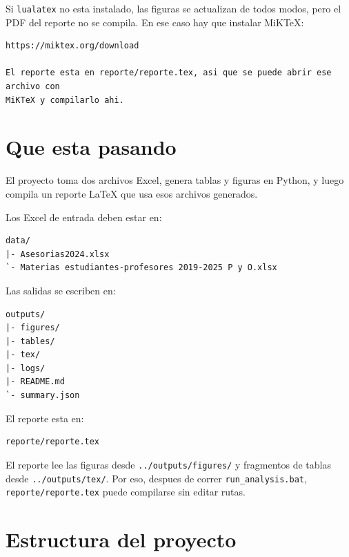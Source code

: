 \documentclass[11pt,letterpaper]{article}
\newcommand{\code}[1]{\texttt{#1}}
\begin{document}
\begin{advertencia}
Si \code{lualatex} no esta instalado, las figuras se actualizan de todos modos,
pero el PDF del reporte no se compila. En ese caso hay que instalar MiKTeX:

\begin{verbatim}
https://miktex.org/download

El reporte esta en reporte/reporte.tex, asi que se puede abrir ese archivo con
MiKTeX y compilarlo ahi.
\end{verbatim}
\end{advertencia}



\section{Que esta pasando}

El proyecto toma dos archivos Excel, genera tablas y figuras en Python, y luego
compila un reporte LaTeX que usa esos archivos generados.

\begin{summary}
Los Excel de entrada deben estar en:

\begin{verbatim}
data/
|- Asesorias2024.xlsx
`- Materias estudiantes-profesores 2019-2025 P y O.xlsx
\end{verbatim}
\end{summary}

Las salidas se escriben en:

\begin{verbatim}
outputs/
|- figures/
|- tables/
|- tex/
|- logs/
|- README.md
`- summary.json
\end{verbatim}

\begin{summary}
El reporte esta en:

\begin{verbatim}
reporte/reporte.tex
\end{verbatim}
\end{summary}

El reporte lee las figuras desde \code{../outputs/figures/} y fragmentos de
tablas desde \code{../outputs/tex/}. Por eso, despues de correr
\code{run\_analysis.bat}, \code{reporte/reporte.tex} puede compilarse sin editar rutas.

\section{Estructura del proyecto}
\end{document}
